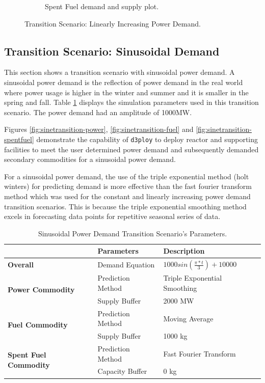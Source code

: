 \documentclass[11pt,letterpaper]{article}
\newcommand{\deploy}{\texttt{d3ploy}\xspace}%
\begin{document}
\begin{figure}[!htbp]
\begin{subfigure}[t]{0.45\textwidth}
        \caption{Spent Fuel demand and supply plot.}
        \label{fig:growingtransition-spentfuel}
    \end{subfigure}
    \caption{Transition Scenario: Linearly Increasing Power Demand.}
\end{figure}

\subsection{\textbf{Transition Scenario: Sinusoidal Demand}}
This section shows a transition scenario with sinusoidal
power demand. 
A sinusoidal power demand is the reflection of power demand in 
the real world where power usage is higher in the winter and summer
and it is smaller in the spring and fall. 
Table \ref{tab:transition-scenario-sine-power} displays the 
simulation parameters used in this transition scenario. The power demand
had an amplitude of 1000MW.

Figures \ref{fig:sinetransition-power}, \ref{fig:sinetransition-fuel}
and \ref{fig:sinetransition-spentfuel} demonstrate the capability 
of \deploy to deploy reactor and supporting facilities to meet the user 
determined power demand and subsequently demanded secondary commodities 
for a sinusoidal power demand. 

For a sinusoidal power demand, the use of the triple exponential method
(holt winters)
for predicting demand is more effective than the 
fast fourier transform method which was used for the constant 
and linearly increasing power demand transition scenarios. 
This is because the triple exponential smoothing method excels in
forecasting data points for repetitive seasonal series of data.  

\begin{table}[!htbp]
	\centering
	\caption {Sinusoidal Power Demand Transition Scenario's Parameters.}
	\label{tab:transition-scenario-sine-power}
	\begin{tabular}{|l|l|p{4.5cm}|}
		\hline
		& \textbf{Parameters}    & \textbf{Description} \\ \hline
		\textbf{Overall}& Demand Equation & $1000sin(\frac{\pi*t}{3})+10000$ \\ \hline
		\multirow{2}{*}{\textbf{Power Commodity}} & Prediction Method      &  Triple Exponential Smoothing \\ \cline{2-3} 
		& Supply Buffer          &  2000 MW \\ \hline
		\multirow{2}{*}{\textbf{Fuel Commodity}}  & Prediction Method      &  Moving Average\\ \cline{2-3}
		& Supply Buffer & 1000 kg \\ \hline
		\multirow{2}{*}{\textbf{Spent Fuel Commodity}}  & Prediction Method      & Fast Fourier Transform\\ \cline{2-3}
		& Capacity Buffer & 0 kg \\ \hline
	\end{tabular}
\end{table}
\end{document}
